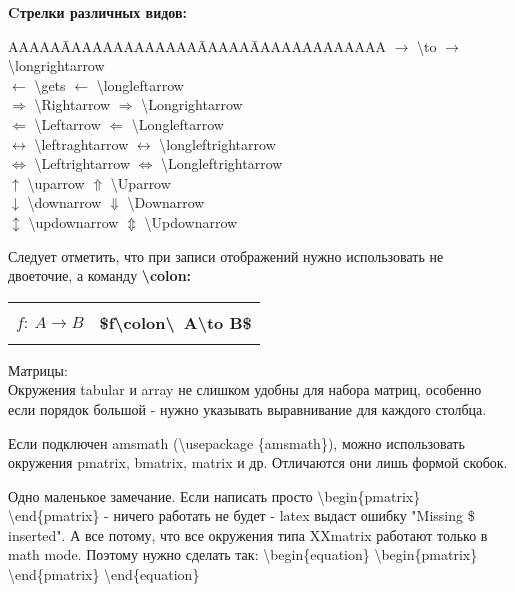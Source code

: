 \documentclass[a4paper,14pt,russian]{extreport}
\begin{document}
\textbf{Cтрелки различных видов:}
\begin{tabbing}
AAAAA\= AAAAAAAAAAAAA\= AAAAA\= AAAAAAAAAAAAA \kill
$\to$ \> \textbackslash to \> $\longrightarrow$ \> \textbackslash  longrightarrow\\
$\gets$ \> \textbackslash gets \> $\longleftarrow$ \> \textbackslash longleftarrow\\
$\Rightarrow$ \> \textbackslash Rightarrow \> $\Longrightarrow$ \> \textbackslash Longrightarrow\\
$\Leftarrow$ \> \textbackslash Leftarrow \> $\Longleftarrow$ \> \textbackslash Longleftarrow\\
$\leftrightarrow$ \> \textbackslash leftraghtarrow \> $\longleftrightarrow$ \> \textbackslash longleftrightarrow\\
$\Leftrightarrow$ \> \textbackslash Leftrightarrow \> $\Longleftrightarrow$ \> \textbackslash Longleftrightarrow\\
$\uparrow$ \> \textbackslash uparrow \> $\Uparrow$ \> \textbackslash Uparrow \\
$\downarrow$ \> \textbackslash downarrow \> $\Downarrow$ \> \textbackslash Downarrow\\
$\updownarrow$ \> \textbackslash updownarrow \> $\Updownarrow$ \> \textbackslash Updownarrow
\end{tabbing}

\newpage

Следует отметить, что при записи отображений нужно использовать не двоеточие, а команду \textbf{\textbackslash  colon:}

\medskip
\begin{center}
\begin{tabular}{|l|l|}
\hline
 & \\
$f\colon\ A\to B$ & \textbf{\$f\textbackslash colon\textbackslash\ A\textbackslash to B\$}\\
 & \\
\hline
\end{tabular}
\end{center}
\medskip

Матрицы:\\
Окружения tabular и array не слишком удобны для набора матриц, особенно если порядок большой - нужно указывать выравнивание для каждого столбца.

Если подключен amsmath (\textbackslash usepackage \{amsmath\}), можно использовать окружения pmatrix, bmatrix, matrix и др. Отличаются они лишь формой скобок.

Одно маленькое замечание. Если написать просто \textbackslash begin\{pmatrix\} \textbackslash end\{pmatrix\} - ничего работать не будет - latex выдаст ошибку "Missing \$ inserted". А все потому, что все окружения типа XXmatrix работают только в math mode. Поэтому нужно сделать так:
\textbackslash begin\{equation\}
\textbackslash begin\{pmatrix\}
\textbackslash end\{pmatrix\}
\textbackslash end\{equation\} 
\newpage
\end{document}
